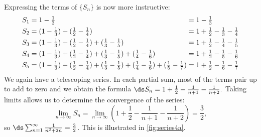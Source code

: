 \begin{example}
\begin{enumerate}
Expressing the terms of $\{S_n\}$ is now more instructive:%
{%
\small%
\begin{align*}
S_1 &= 1-\tfrac13 &&= 1-\tfrac13\\
S_2 &= (1-\tfrac13) + (\tfrac12-\tfrac14) &&= 1+\tfrac12-\tfrac13-\tfrac14\\
S_3 &= (1-\tfrac13) + (\tfrac12-\tfrac14) + (\tfrac13-\tfrac15)
&&= 1+\tfrac12-\tfrac14-\tfrac15\\
S_4 &= (1-\tfrac13) + (\tfrac12-\tfrac14) + (\tfrac13-\tfrac15) + (\tfrac14-\tfrac16)
&&= 1+\tfrac12-\tfrac15-\tfrac16\\
S_5 &= (1-\tfrac13) + (\tfrac12-\tfrac14) + (\tfrac13-\tfrac15) + (\tfrac14-\tfrac16) + (\tfrac15-\tfrac17)\mkern-18mu
&&= 1+\tfrac12-\tfrac16-\tfrac17
\end{align*}}%
%
%
%
We again have a telescoping series. In each partial sum, most of the terms pair up to add to zero and we obtain the formula $\ds S_n = 1+\frac12-\frac1{n+1}-\frac1{n+2}.$ Taking limits allows us to determine the convergence of the series:
\[
\lim_{n\to\infty}S_n
= \lim_{n\to\infty} \left(1+\frac12-\frac1{n+1}-\frac1{n+2}\right) = \frac32,
\]
so $\ds\sum_{n=1}^\infty \frac1{n^2+2n} = \frac32$.
This is illustrated in \autoref{fig:series4a}.


\end{enumerate}
\end{example}
